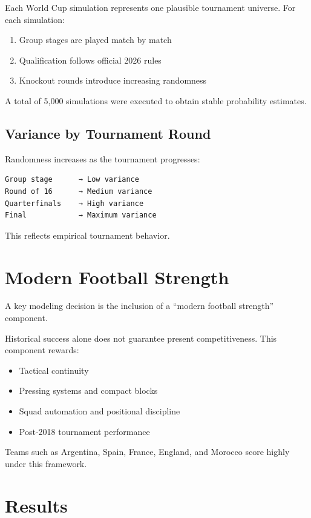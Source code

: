 \documentclass[11pt,a4paper]{article}
\begin{document}
Each World Cup simulation represents one plausible tournament universe. For each simulation:
\begin{enumerate}
    \item Group stages are played match by match
    \item Qualification follows official 2026 rules
    \item Knockout rounds introduce increasing randomness
\end{enumerate}

A total of 5,000 simulations were executed to obtain stable probability estimates.

\subsection{Variance by Tournament Round}

Randomness increases as the tournament progresses:

\begin{verbatim}
Group stage      → Low variance
Round of 16      → Medium variance
Quarterfinals    → High variance
Final            → Maximum variance
\end{verbatim}

This reflects empirical tournament behavior.

\section{Modern Football Strength}

A key modeling decision is the inclusion of a ``modern football strength'' component.

Historical success alone does not guarantee present competitiveness. This component rewards:
\begin{itemize}
    \item Tactical continuity
    \item Pressing systems and compact blocks
    \item Squad automation and positional discipline
    \item Post-2018 tournament performance
\end{itemize}

Teams such as Argentina, Spain, France, England, and Morocco score highly under this framework.

\section{Results}
\end{document}
